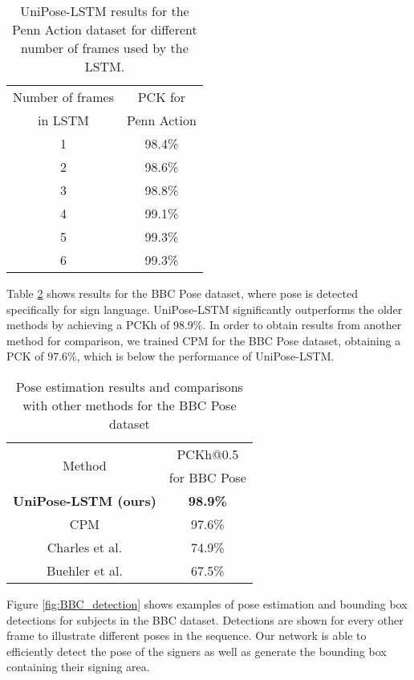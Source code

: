 \documentclass[10pt,twocolumn,letterpaper]{article}
\begin{document}
\begin{table}[!ht]
\begin{center}
\begin{tabular}{|c|c|}
\hline
    Number of frames&PCK for\\
    in LSTM&Penn Action\\
\hline\hline
    1&98.4\%\\
    2&98.6\%\\
    3&98.8\%\\
    4&99.1\%\\
    5&99.3\%\\
    6&99.3\%\\
\hline
\end{tabular}
\end{center}
\caption{UniPose-LSTM results for the Penn Action dataset for different number of frames used by the LSTM.}
\label{tab:LSTM}
\end{table}




Table \ref{tab:BBC} shows results for the BBC Pose dataset, where pose is detected specifically for sign language. UniPose-LSTM significantly outperforms the older methods by achieving a PCKh of 98.9\%. In order to obtain results from another method for comparison, we trained CPM for the BBC Pose dataset, obtaining a PCK of 97.6\%, which is below the performance of UniPose-LSTM. 

\begin{table}[!ht]
\begin{center}
\begin{tabular}{|c|c|}
\hline
    \multirow{2}{*}{Method}&PCKh@0.5\\
    &for BBC Pose\\
\hline\hline
    \textbf{UniPose-LSTM (ours)}&\textbf{98.9\%}\\
    CPM \cite{CPM}&97.6\%\\
    Charles et al. \cite{AutomaticSign}&74.9\%\\
    Buehler et al. \cite{UpperBodySign}&67.5\%\\
\hline
\end{tabular}
\end{center}
\caption{Pose estimation results and comparisons with other methods for the BBC Pose dataset}
\label{tab:BBC}
\end{table}

Figure \ref{fig:BBC_detection} shows examples of pose estimation and bounding box detections for subjects in the BBC dataset. Detections are shown for every other frame to illustrate different poses in the sequence.
Our network is able to efficiently detect the pose of the signers as well as generate the bounding box containing their signing area. 
\end{document}
